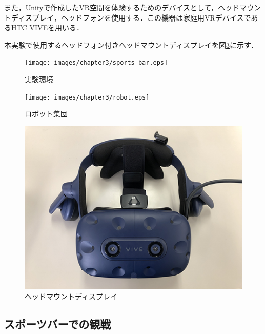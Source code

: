 また，Unityで作成したVR空間を体験するためのデバイスとして，ヘッドマウントディスプレイ，ヘッドフォンを使用する．この機器は家庭用VRデバイスであるHTC VIVEを用いる\cite{vive}．

本実験で使用するヘッドフォン付きヘッドマウントディスプレイを図\ref{Vive}に示す．


\vspace{1cm}
 \begin{figure}[H]
 \begin{center}
  \centering
  \texttt{[image: images/chapter3/sports\_bar.eps]}
  \caption{実験環境}
  \label{sports_bar}
 \end{center}
\end{figure}


\newpage

\vspace{1cm}
 \begin{figure}[!h]
 \begin{center}
  \centering
  \texttt{[image: images/chapter3/robot.eps]}
  \caption{ロボット集団}
  \label{robot}
 \end{center}
\end{figure}


\vspace{1cm}
 \begin{figure}[!h]
 \begin{center}
  \centering
  \includegraphics[width=12cm]{images/chapter3/Vive.eps}
  \caption{ヘッドマウントディスプレイ}
  \label{Vive}
 \end{center}
\end{figure}


\subsection{スポーツバーでの観戦}
\label{sec3.2.1}

